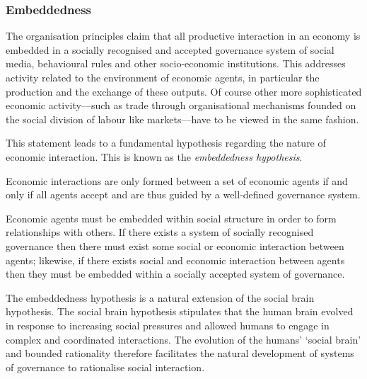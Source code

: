 \subsubsection{Embeddedness}

The organisation principles claim that all productive interaction in an economy is embedded in a socially recognised and accepted governance system of social media, behavioural rules and other socio-economic institutions. This addresses activity related to the environment of economic agents, in particular the production and the exchange of these outputs. Of course other more sophisticated economic activity---such as trade through organisational mechanisms founded on the social division of labour like markets---have to be viewed in the same fashion.

This statement leads to a fundamental hypothesis regarding the nature of economic interaction. This is known as the \emph{embeddedness hypothesis}.
\begin{hypothesis} \label{ax:embeddednesshypothesis}
Economic interactions are only formed between a set of economic agents if and only if all agents accept and are thus guided by a well-defined governance system.
\end{hypothesis}
Economic agents must be embedded within social structure in order to form relationships with others. If there exists a system of socially recognised governance then there must exist some social or economic interaction between agents; likewise, if there exists social and economic interaction between agents then they must be embedded within a socially accepted system of governance.

The embeddedness hypothesis is a natural extension of the social brain hypothesis. The social brain hypothesis stipulates that the human brain evolved in response to increasing social pressures and allowed humans to engage in complex and coordinated interactions. The evolution of the humans' `social brain' and bounded rationality therefore facilitates the natural development of systems of governance to rationalise social interaction. 

